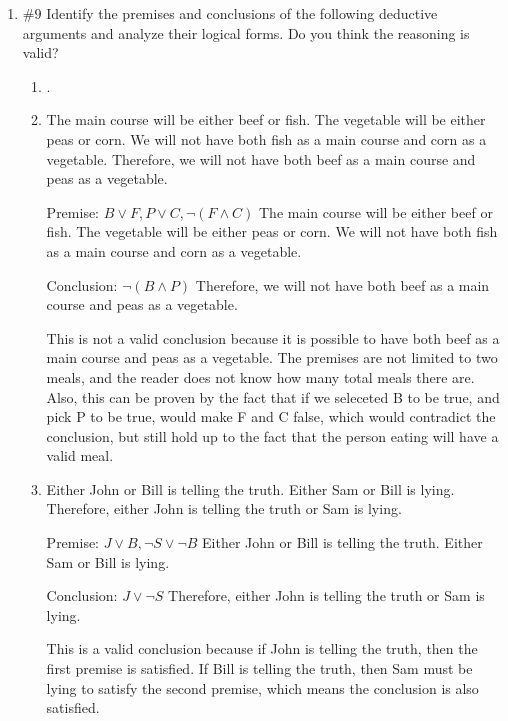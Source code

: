 \documentclass[12pt]{exam}
\begin{document}
\begin{enumerate} [listparindent=1.5em]
\begin{enumerate} 
\item $T \lor D.$

Taxes will go up or the deficit will go up.

\item $\lnot(T \land D) \land \lnot(\lnot T \land \lnot D).$

Neither will both the taxes and deficits go up nor will the deficit go up if the taxes do not go up.

\item $(T \land \lnot D) \lor (D \land \lnot T).$

Either the taxes will go up and the deficit will not go up, or the deficit will go up and the taxes won't go up.
\end{enumerate}

\item $\#9$ Identify the premises and conclusions of the following deductive
arguments and analyze their logical forms. Do you think the reasoning
is valid?

\begin {enumerate} 

\item .
\item The main course will be either beef or fish. The vegetable will be
either peas or corn. We will not have both fish as a main course and
corn as a vegetable. Therefore, we will not have both beef as a main
course and peas as a vegetable. 

Premise: $B \lor F, P\lor C, \lnot (F \land C)$ The main course will be either beef or fish. The vegetable will be either peas or corn. We will not have both fish as a main course and corn as a vegetable.

Conclusion: $\lnot (B \land P)$ Therefore, we will not have both beef as a main course and peas as a vegetable.

This is not a valid conclusion because it is possible to have both beef as a main course and peas as a vegetable. The premises are not limited to two meals, and the reader does not know how many total meals there are. Also, this can be proven by the fact that if we seleceted B to be true, and pick P to be true, would make F and C false, which would contradict the conclusion, but still hold up to the fact that the person eating will have a valid meal.


\item Either John or Bill is telling the truth. Either Sam or Bill is lying.
Therefore, either John is telling the truth or Sam is lying.

Premise: $J \lor B, \lnot S \lor \lnot B$ Either John or Bill is telling the truth. Either Sam or Bill is lying.

Conclusion: $J \lor \lnot S$ Therefore, either John is telling the truth or Sam is lying.

This is a valid conclusion because if John is telling the truth, then the first premise is satisfied. If Bill is telling the truth, then Sam must be lying to satisfy the second premise, which means the conclusion is also satisfied.
\end {enumerate}
\end{enumerate}
\end{document}
